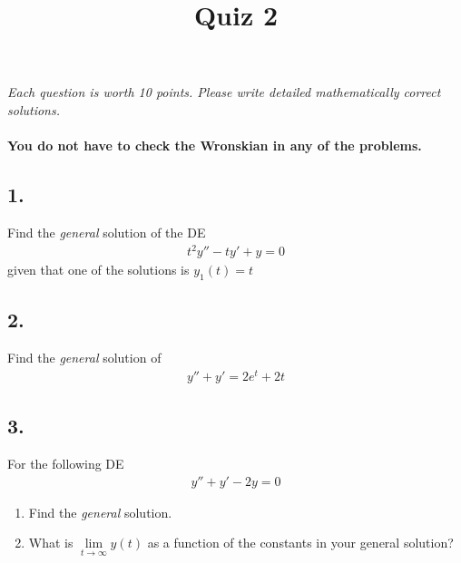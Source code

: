 


\title{Quiz 2}


\maketitle

\thispagestyle{fancy}





\emph{Each question is worth 10 points. Please write detailed mathematically correct solutions.}\\\\


\textbf{You do not have to check the Wronskian in any of the problems.}\\



\subsection*{1. }
Find the \emph{general} solution of the DE
\begin{align*}
	t^2 y'' -ty' +y=0
\end{align*}
given that one of the solutions is $y_1(t) = t$
\vspace{0.5em}





\subsection*{2. }
Find the \emph{general} solution of
\begin{align*}
	y'' + y'= 2e^{t} + 2t
\end{align*}
\vspace{0.5em}






\subsection*{3. }
For the following DE
\begin{align*}
	y'' + y' - 2y = 0
\end{align*}
\begin{enumerate}
	\item Find the \emph{general} solution.
	\item What is $\lim \limits_{t \rightarrow \infty} y(t)$ as a function of the constants in your general solution?
\end{enumerate}
\vspace{0.5em}



